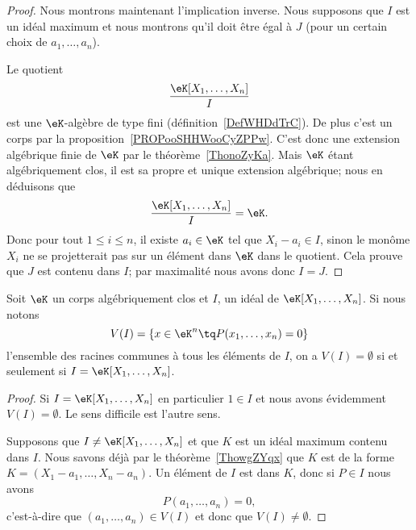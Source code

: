 \begin{proof}
    Nous montrons maintenant l'implication inverse. Nous supposons que \( I\) est un idéal maximum et nous montrons qu'il doit être égal à \( J\) (pour un certain choix de \( a_1,\ldots, a_n\)).

    Le quotient
    \begin{equation}
        \frac{ \eK[X_1,\ldots, X_n] }{ I }
    \end{equation}
    est une \( \eK\)-algèbre de type fini (définition~\ref{DefWHDdTrC}). De plus c'est un corps par la proposition~\ref{PROPooSHHWooCyZPPw}. C'est donc une extension algébrique finie de \( \eK\) par le théorème~\ref{ThonoZyKa}. Mais \( \eK\) étant algébriquement clos, il est sa propre et unique extension algébrique; nous en déduisons que
    \begin{equation}
        \frac{ \eK[X_1,\ldots, X_n] }{ I }=\eK.
    \end{equation}
    Donc pour tout \( 1\leq i\leq n\), il existe \( a_i\in \eK\) tel que \( X_i-a_i\in I\), sinon le monôme \( X_i\) ne se projetterait pas sur un élément dans \( \eK\) dans le quotient. Cela prouve que \( J\) est contenu dans \( I\); par maximalité nous avons donc \( I=J\).
\end{proof}

\begin{corollary}
    Soit \( \eK\) un corps algébriquement clos et \( I\), un idéal de \( \eK[X_1,\ldots, X_n]\). Si nous notons
    \begin{equation}
        V(I)=\{ x\in \eK^n\tq P(x_1,\ldots, x_n)=0 \}
    \end{equation}
    l'ensemble des racines communes à tous les éléments de \( I\), on a \( V(I)=\emptyset\) si et seulement si \( I=\eK[X_1,\ldots, X_n]\).
\end{corollary}

\begin{proof}
    Si \( I=\eK[X_1,\ldots, X_n]\) en particulier \( 1\in I\) et nous avons évidemment \( V(I)=\emptyset\). Le sens difficile est l'autre sens.

    Supposons que \( I\neq \eK[X_1,\ldots, X_n]\) et que \( K\) est un idéal maximum contenu dans \( I\). Nous savons déjà par le théorème~\ref{ThowgZYqx} que \( K\) est de la forme \( K=(X_1-a_1,\ldots, X_n-a_n)\). Un élément de \( I\) est dans \( K\), donc si \( P\in I\) nous avons
    \begin{equation}
        P(a_1,\ldots, a_n)=0,
    \end{equation}
    c'est-à-dire que \( (a_1,\ldots, a_n)\in V(I)\) et donc que \( V(I)\neq \emptyset \).
\end{proof}

